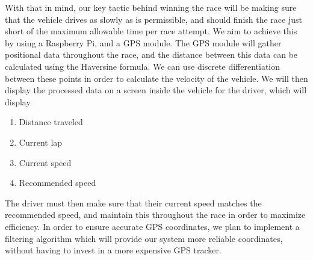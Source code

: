 \documentclass[a4paper, 12pt]{article}
\begin{document}
			With that in mind, our key tactic behind winning the race will be making sure that the vehicle drives as slowly as is permissible, and should finish the race just short of the maximum allowable time per race attempt. We aim to achieve this by using a Raspberry Pi, and a GPS module. The GPS module will gather positional data throughout the race, and the distance between this data can be calculated using the Haversine formula. We can use discrete differentiation between these points in order to calculate the velocity of the vehicle. We will then display the processed data on a screen inside the vehicle for the driver, which will display
			\begin{enumerate}
				\item Distance traveled
				\item Current lap
				\item Current speed
				\item Recommended speed
			\end{enumerate}

			The driver must then make sure that their current speed matches the recommended speed, and maintain this throughout the race in order to maximize efficiency. In order to ensure accurate GPS coordinates, we plan to implement a filtering algorithm which will provide our system more reliable coordinates, without having to invest in a more expensive GPS tracker.

\end{document}
